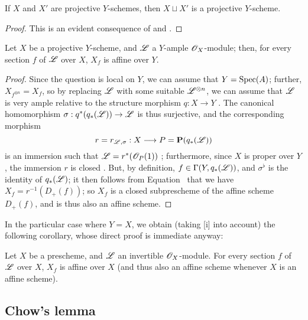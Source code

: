 \begin{prop}[5.5.6]
\label{2.5.5.6}
If $X$ and $X'$ are projective $Y$-schemes, then $X\sqcup X'$ is a projective $Y$-scheme.
\end{prop}

\begin{proof}
\label{proof-2.5.5.6}
This is an evident consequence of  and .
\end{proof}

\begin{prop}[5.5.7]
\label{2.5.5.7}
Let $X$ be a projective $Y$-scheme, and $\mathscr{L}$ a $Y$-ample $\mathscr{O}_X$-module;
then, for every section $f$ of $\mathscr{L}$ over $X$, $X_f$ is affine over $Y$.
\end{prop}

\begin{proof}
\label{proof-2.5.5.6}
Since the question is local on $Y$, we can assume that $Y={\mathop{\mathrm{Spec}}\nolimits}(A)$;
further, $X_{f^{\otimes n}}=X_f$, so by replacing $\mathscr{L}$ with some suitable $\mathscr{L}^{\otimes n}$, we can assume that $\mathscr{L}$ is very ample relative to the structure morphism $q:X\to Y$ .
The canonical homomorphism $\sigma:q^*(q_*(\sh{L}))\to\sh{L}$ is thus surjective, and the corresponding morphism
\[
    r=r_{\sh{L},\sigma}:X\to P=\PP(q_*(\sh{L}))
\]
is an immersion such that $\mathscr{L}=r^*(\mathscr{O}_P(1))$ ;
furthermore, since $X$ is proper over $Y$, the immersion $r$ is closed .
But, by definition, $f\in\Gamma(Y,q_*(\mathscr{L}))$, and $\sigma^\flat$ is the identity of $q_*(\mathscr{L})$;
it then follows from Equation~ that we have $X_f=r^{-1}(D_+(f))$;
so $X_f$ is a closed subprescheme of the affine scheme $D_+(f)$, and is thus also an affine scheme.
\end{proof}

In the particular case where $Y=X$, we obtain (taking [i] into account) the following corollary, whose direct proof is immediate anyway:
\begin{cor}[5.5.8]
\label{2.5.5.8}
Let $X$ be a prescheme, and $\mathscr{L}$ an invertible $\mathscr{O}_X$-module.
For every section $f$ of $\mathscr{L}$ over $X$, $X_f$ is affine over $X$ (and thus also an affine scheme whenever $X$ is an affine scheme).
\end{cor}

\subsection{Chow's lemma}
\label{subsection:chows-lemma}

